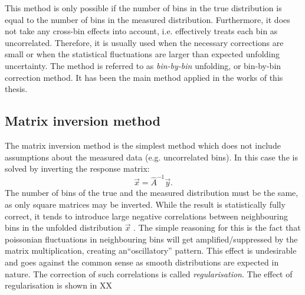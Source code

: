 This method is only possible if the number of bins in the true distribution is equal to the number of bins in the measured distribution.
Furthermore, it does not take any cross-bin effects into account, i.e. effectively treats each bin as uncorrelated.
Therefore, it is usually used when the necessary corrections are small or when the statistical fluctuations are larger than expected unfolding uncertainty.
The method is referred to as \textit{bin-by-bin} unfolding, or bin-by-bin correction method.
It has been the main method applied in the works of this thesis.

\subsection{Matrix inversion method}
The matrix inversion method is the simplest method which does not include assumptions about the measured data (e.g. uncorrelated bins).
In this case the  is solved by inverting the response matrix:
\begin{equation}
    \vec{x} = \hat{A}^{-1}\vec{y}.
\end{equation}
The number of bins of the true and the measured distribution must be the same, as only square matrices may be inverted.
While the result is statistically fully correct, it tends to introduce large negative correlations between neighbouring bins in the unfolded distribution $\vec{x}$ \cite{Schmitt:2016orm}.
The simple reasoning for this is the fact that poissonian fluctuations in neighbouring bins will get amplified/suppressed by the matrix multiplication, creating an``oscillatory'' pattern.
This effect is undesirable and goes against the common sense as smooth distributions are expected in nature.
The correction of such correlations is called \textit{regularisation}.
The effect of regularisation is shown in XX

